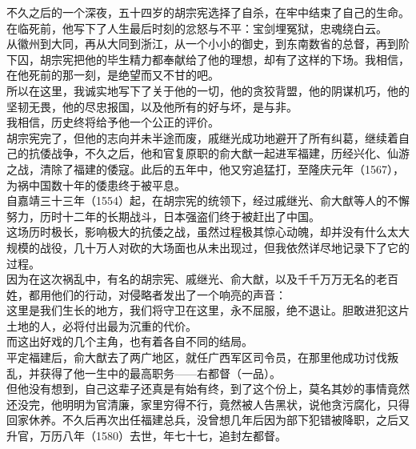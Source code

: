 \begin{multicols}{\theparacolNo}
不久之后的一个深夜，五十四岁的胡宗宪选择了自杀，在牢中结束了自己的生命。\\

在临死前，他写下了人生最后时刻的忿怒与不平：宝剑埋冤狱，忠魂绕白云。\\

从徽州到大同，再从大同到浙江，从一个小小的御史，到东南数省的总督，再到阶下囚，胡宗宪把他的毕生精力都奉献给了他的理想，却有了这样的下场。我相信，在他死前的那一刻，是绝望而又不甘的吧。\\

所以在这里，我诚实地写下了关于他的一切，他的贪狡背盟，他的阴谋机巧，他的坚韧无畏，他的尽忠报国，以及他所有的好与坏，是与非。\\

我相信，历史终将给予他一个公正的评价。\\

胡宗宪完了，但他的志向并未半途而废，戚继光成功地避开了所有纠葛，继续着自己的抗倭战争，不久之后，他和官复原职的俞大猷一起进军福建，历经兴化、仙游之战，清除了福建的倭寇。此后的五年中，他又穷追猛打，至隆庆元年（1567），为祸中国数十年的倭患终于被平息。\\

自嘉靖三十三年（1554）起，在胡宗宪的统领下，经过戚继光、俞大猷等人的不懈努力，历时十二年的长期战斗，日本强盗们终于被赶出了中国。\\

这场历时极长，影响极大的抗倭之战，虽然过程极其惊心动魄，却并没有什么太大规模的战役，几十万人对砍的大场面也从未出现过，但我依然详尽地记录下了它的过程。\\

因为在这次祸乱中，有名的胡宗宪、戚继光、俞大猷，以及千千万万无名的老百姓，都用他们的行动，对侵略者发出了一个响亮的声音：\\

这里是我们生长的地方，我们将守卫在这里，永不屈服，绝不退让。胆敢进犯这片土地的人，必将付出最为沉重的代价。\\

而这出好戏的几个主角，也有着各自不同的结局。\\

平定福建后，俞大猷去了两广地区，就任广西军区司令员，在那里他成功讨伐叛乱，并获得了他一生中的最高职务——右都督（一品）。\\

但他没有想到，自己这辈子还真是有始有终，到了这个份上，莫名其妙的事情竟然还没完，他明明为官清廉，家里穷得不行，竟然被人告黑状，说他贪污腐化，只得回家休养。不久后再次出任福建总兵，没曾想几年后因为部下犯错被降职，之后又升官，万历八年（1580）去世，年七十七，追封左都督。\\


\end{multicols}
